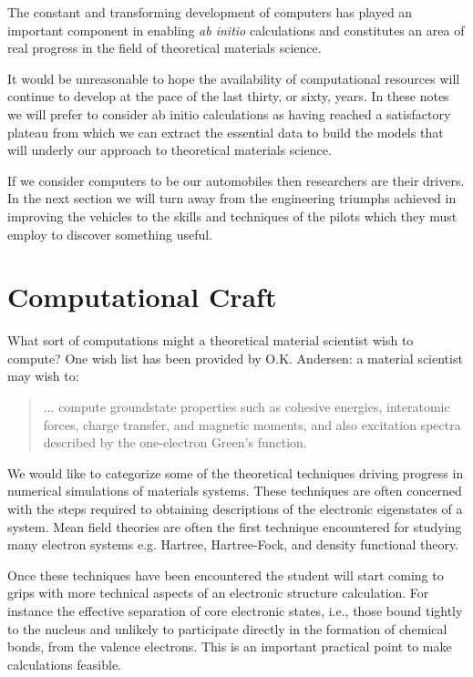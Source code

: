 The constant and transforming development of computers
has played an important component in enabling {\it ab initio} 
calculations and constitutes an area of real progress in the field of theoretical
materials science. 

It would be unreasonable to hope 
the availability of computational resources will continue to develop
at the pace of the last thirty, or sixty, years. In these notes we will prefer to
consider ab initio calculations as having reached a satisfactory
plateau from which we can extract the essential data to build
the models that will underly our approach to theoretical
materials science.

If we consider computers to be our automobiles then researchers are their drivers.
In the next section we will turn away from the engineering triumphs
achieved in improving the vehicles to the skills and techniques of the pilots
which they must employ to discover something useful.

\section{Computational Craft}
What sort of computations might a theoretical material scientist
wish to compute? One wish list has been provided by O.K. Andersen:
a material scientist may wish to:
%
\begin{quote}
... compute groundstate properties such as cohesive energies, interatomic forces, 
charge transfer, and magnetic moments, and also excitation spectra described 
by the one-electron Green's function\cite{anderson75}.
\end{quote}
%

We would like to categorize some of the theoretical techniques driving progress in numerical 
simulations of materials systems. These techniques are often concerned
with the steps required to obtaining descriptions of the electronic eigenstates 
of a system. Mean field theories are often the first technique encountered
for studying many electron systems e.g. Hartree, Hartree-Fock, and density functional theory. 

Once these techniques have been encountered the student will start coming to grips
with more technical aspects of an electronic structure calculation. For instance the effective 
separation of core electronic states, i.e., those bound tightly to the nucleus and unlikely
to participate directly in the formation of chemical bonds, from the 
valence electrons. This is an important practical point to make calculations feasible.

